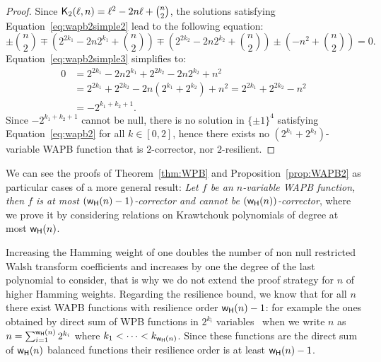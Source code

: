 \documentclass[11pt]{llncs}
\begin{document}
\begin{proof}
Since $ \mathsf{K}_{2}(\ell,n)=\ell^2 -2 n \ell + \binom{n}{2}$, the solutions satisfying Equation~\ref{eq:wapb2simple2} lead to the following equation:
\begin{equation}\label{eq:wapb2simple3}
\pm \binom{n}{2} \mp \left(2^{2k_1} -2n2^{k_1} + \binom{n}{2} \right) \mp \left(2^{2k_2} -2n2^{k_2} + \binom{n}{2} \right) \pm \left(-n^2 + \binom{n}{2}\right)=0.
\end{equation}
Equation~\ref{eq:wapb2simple3} simplifies to:
\begin{align*}
0&=2^{2k_1} -2n2^{k_1} + 2^{2k_2} -2n2^{k_2} +n^2\\
&=2^{2k_1} + 2^{2k_2} -2n(2^{k_1}+2^{k_2}) +n^2 = 2^{2k_1} + 2^{2k_2} -n^2\\
&= -2^{k_1+k_2+1}.
\end{align*}	
Since $-2^{k_1+k_2+1}$ cannot be null, there is no solution in $\{\pm1\}^4$ satisfying Equation~\ref{eq:wapb2} for all $k\in[0,2]$, hence there exists no $(2^{k_1}+2^{k_2})$-variable WAPB function that is $2$-corrector, nor $2$-resilient.



\end{proof}


\begin{remark}
We can see the proofs of Theorem~\ref{thm:WPB} and Proposition~\ref{prop:WAPB2} as particular cases of a more general result: \textit{Let $f$ be an $n$-variable WAPB function, then $f$ is at most $(\mathsf{w_H}(n)-1)$-corrector and cannot be $(\mathsf{w_H}(n))$-corrector}, where we prove it by considering relations on Krawtchouk polynomials of degree at most $\mathsf{w_H}(n)$. 

Increasing the Hamming weight of one doubles the number of non null restricted Walsh transform coefficients and increases by one the degree of the last polynomial to consider, that is why we do not extend the proof strategy for $n$ of higher Hamming weights. 
Regarding the resilience bound, we know that for all $n$ there exist WAPB functions with resilience order $\mathsf{w_H}(n)-1$: for example the ones obtained by direct sum of WPB functions in $2^{k_i}$ variables~\cite{DAM:ZhuSu22} when we write $n$ as $n=\sum_{i=1}^{\mathsf{w_H}(n)} 2^{k_i}$ where $k_1<\dots<k_{\mathsf{w_H}(n)}$. 
Since these functions are the direct sum of $\mathsf{w_H}(n)$ balanced functions their resilience order is at least $\mathsf{w_H}(n)-1$.




\end{remark}
\end{document}
